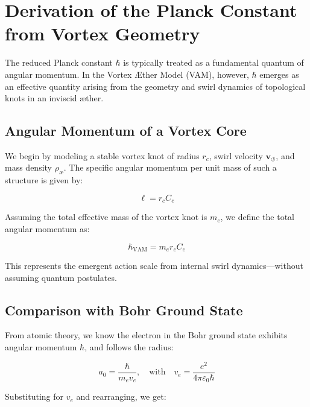 
\section{Derivation of the Planck Constant from Vortex Geometry}
\label{appendix:hbar}

The reduced Planck constant \( \hbar \) is typically treated as a fundamental quantum of angular momentum. In the Vortex Æther Model (VAM), however, \( \hbar \) emerges as an effective quantity arising from the geometry and swirl dynamics of topological knots in an inviscid æther.

\subsection{Angular Momentum of a Vortex Core}

We begin by modeling a stable vortex knot of radius \( r_c \), swirl velocity \( \mathbf{v}_{\scriptscriptstyle\boldsymbol{\circlearrowleft}} \), and mass density \( \rho_\text{\ae} \). The specific angular momentum per unit mass of such a structure is given by:

\begin{equation}
    \ell = r_c C_e
\end{equation}

Assuming the total effective mass of the vortex knot is \( m_e \), we define the total angular momentum as:

\begin{equation}
    \hbar_{\text{VAM}} = m_e r_c C_e
\end{equation}

This represents the emergent action scale from internal swirl dynamics—without assuming quantum postulates.

\subsection{Comparison with Bohr Ground State}

From atomic theory, we know the electron in the Bohr ground state exhibits angular momentum \( \hbar \), and follows the radius:

\begin{equation}
    a_0 = \frac{\hbar}{m_e v_e}, \quad \text{with} \quad v_e = \frac{e^2}{4\pi \varepsilon_0 \hbar}
\end{equation}

Substituting for \( v_e \) and rearranging, we get:

